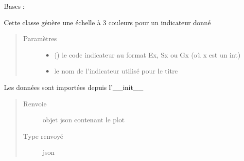 \documentclass[letterpaper,10pt,french]{sphinxmanual}
\begin{document}
\begin{fulllineitems}
\label{\detokenize{app.home.content_gen:app.home.content_gen.graph_generation.BulletChart}}
\sphinxAtStartPar
Bases : 

\sphinxAtStartPar
Cette classe génère une échelle à 3 couleurs pour un indicateur donné
\begin{quote}\begin{description}
\item[{Paramètres}] \leavevmode\begin{itemize}
\item {} 
\sphinxAtStartPar
{} () \textendash{} le code indicateur au format Ex, Sx ou Gx (où x est un int)

\item {} 
\sphinxAtStartPar
{} \textendash{} le nom de l’indicateur utilisé pour le titre

\end{itemize}

\end{description}\end{quote}

\begin{fulllineitems}
\label{\detokenize{app.home.content_gen:app.home.content_gen.graph_generation.BulletChart.plot}}
\sphinxAtStartPar
Les données sont importées depuis l’\_\_init\_\_
\begin{quote}\begin{description}
\item[{Renvoie}] \leavevmode
\sphinxAtStartPar
objet json contenant le plot

\item[{Type renvoyé}] \leavevmode
\sphinxAtStartPar
json

\end{description}\end{quote}

\end{fulllineitems}


\end{fulllineitems}
\end{document}
